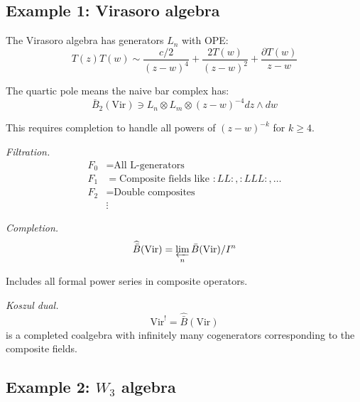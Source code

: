 \subsection{Example 1: Virasoro algebra}

\begin{example}\label{ex:virasoro-completion}
The Virasoro algebra has generators $L_n$ with OPE:
\[T(z)T(w) \sim \frac{c/2}{(z-w)^4} + \frac{2T(w)}{(z-w)^2} + \frac{\partial T(w)}{z-w}\]

The quartic pole means the naive bar complex has:
\[\bar{B}_2(\text{Vir}) \ni L_n \otimes L_m \otimes (z-w)^{-4} dz \wedge dw\]

This requires completion to handle all powers of $(z-w)^{-k}$ for $k \geq 4$.

\emph{Filtration.}
\begin{align*}
F_0 &= \text{All L-generators} \\
F_1 &= \text{Composite fields like } :LL:, :LLL:, \ldots \\
F_2 &= \text{Double composites} \\
&\vdots
\end{align*}

\emph{Completion.}
\[\widehat{\bar{B}}(\text{Vir}) = \varprojlim_n \bar{B}(\text{Vir})/I^n\]

Includes all formal power series in composite operators.

\emph{Koszul dual.}
\[\text{Vir}^! = \widehat{\bar{B}}(\text{Vir})\]
is a completed coalgebra with infinitely many cogenerators corresponding to the composite fields.
\end{example}

\subsection{\texorpdfstring{Example 2: $W_3$ algebra}{Example 2: W-3 algebra}}

